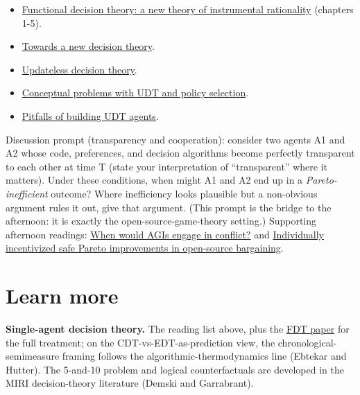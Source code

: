 \documentclass[11pt]{article}
\begin{document}
\begin{itemize}
\item
  \href{https://arxiv.org/abs/1710.05060}{Functional decision theory: a new theory of instrumental rationality} (chapters 1-5).
\item
  \href{https://www.lesswrong.com/posts/de3xjFaACCAk6imzv/towards-a-new-decision-theory}{Towards a new decision theory}.
\item
  \href{https://www.lesswrong.com/w/updateless-decision-theory}{Updateless decision theory}.
\item
  \href{https://www.lesswrong.com/posts/9sYzoRnmqmxZm4Whf/conceptual-problems-with-udt-and-policy-selection}{Conceptual problems with UDT and policy selection}.
\item
  \href{https://www.lesswrong.com/posts/y3zTP6sixGjAkz7xE/pitfalls-of-building-udt-agents}{Pitfalls of building UDT agents}.
\end{itemize}

Discussion prompt (transparency and cooperation): consider two agents A1 and A2 whose code, preferences, and decision algorithms become perfectly transparent to each other at time T (state your interpretation of ``transparent'' where it matters). Under these conditions, when might A1 and A2 end up in a \emph{Pareto-inefficient} outcome? Where inefficiency looks plausible but a non-obvious argument rules it out, give that argument. (This prompt is the bridge to the afternoon: it is exactly the open-source-game-theory setting.) Supporting afternoon readings: \href{https://www.lesswrong.com/posts/cLDcKgvM6KxBhqhGq/when-would-agis-engage-in-conflict}{When would AGIs engage in conflict?} and \href{https://www.lesswrong.com/posts/uGfDx9es2pnYWaWJr/individually-incentivized-safe-pareto-improvements-in-open}{Individually incentivized safe Pareto improvements in open-source bargaining}.

\section{Learn more}
\textbf{Single-agent decision theory.} The reading list above, plus the \href{https://arxiv.org/abs/1710.05060}{FDT paper} for the full treatment; on the CDT-vs-EDT-as-prediction view, the chronological-semimeasure framing follows the algorithmic-thermodynamics line (Ebtekar and Hutter). The 5-and-10 problem and logical counterfactuals are developed in the MIRI decision-theory literature (Demski and Garrabrant).
\end{document}
